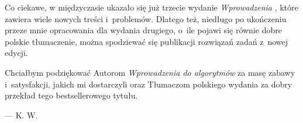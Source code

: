 Co ciekawe, w międzyczasie ukazało się już trzecie wydanie \textsl{Wprowadzenia} \cite{cormen3}, które zawiera wiele nowych treści i~problemów. Dlatego też, niedługo po ukończeniu przeze mnie opracowania dla wydania drugiego, o~ile pojawi się równie dobre polskie tłumaczenie, można spodziewać się publikacji rozwiązań zadań z~nowej edycji.

Chciałbym podziękować Autorom \textsl{Wprowadzenia do algorytmów} za masę zabawy i~satysfakcji, jakich mi dostarczyli oraz Tłumaczom polskiego wydania za dobry przekład tego bestsellerowego tytułu.

\bigskip
{}\hfill--- K. W.

\endinput
